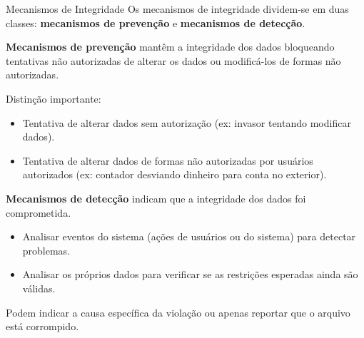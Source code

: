 \begin{frame}{Mecanismos de Integridade}
Os mecanismos de integridade dividem-se em duas classes: \textbf{mecanismos de prevenção} e \textbf{mecanismos de detecção}.

\vspace{0.3cm}
\textbf{Mecanismos de prevenção} mantêm a integridade dos dados bloqueando tentativas não autorizadas de alterar os dados ou modificá-los de formas não autorizadas.

\vspace{0.3cm}
Distinção importante:
\begin{itemize}
  \item Tentativa de alterar dados sem autorização (ex: invasor tentando modificar dados).
  \item Tentativa de alterar dados de formas não autorizadas por usuários autorizados (ex: contador desviando dinheiro para conta no exterior).
\end{itemize}

\vspace{0.3cm}
\textbf{Mecanismos de detecção} indicam que a integridade dos dados foi comprometida.

\begin{itemize}
  \item Analisar eventos do sistema (ações de usuários ou do sistema) para detectar problemas.
  \item Analisar os próprios dados para verificar se as restrições esperadas ainda são válidas.
\end{itemize}

Podem indicar a causa específica da violação ou apenas reportar que o arquivo está corrompido.


\end{frame}

